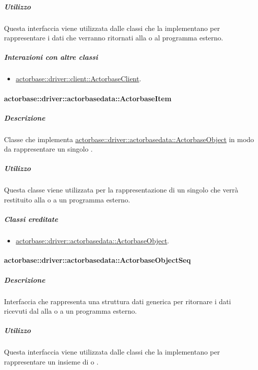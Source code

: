 \documentclass{scalatekids-article}
\begin{document}
\subparagraph{Utilizzo}

Questa interfaccia viene utilizzata dalle classi che la implementano per
rappresentare i dati che verranno ritornati alla  o al programma
esterno.

\subparagraph{Interazioni con altre classi}

\begin{itemize}
\item \hyperref[sec:actorbase::driver::client::ActorbaseClient]{actorbase::driver::client::ActorbaseClient}.
\end{itemize}

\paragraph{actorbase::driver::actorbasedata::ActorbaseItem}
\label{sec:actorbase::driver::actorbasedata::ActorbaseItem}

\subparagraph{Descrizione}

Classe che implementa \hyperref[sec:actorbase::driver::actorbasedata::ActorbaseObject]{actorbase::driver::actorbasedata::ActorbaseObject}
in modo da rappresentare un singolo .

\subparagraph{Utilizzo}

Questa classe viene utilizzata per la rappresentazione di un singolo
 che verrà restituito alla  o a un programma esterno.

\subparagraph{Classi ereditate}

\begin{itemize}
\item \hyperref[sec:actorbase::driver::actorbasedata::ActorbaseObject]{actorbase::driver::actorbasedata::ActorbaseObject}.
\end{itemize}

\paragraph{actorbase::driver::actorbasedata::ActorbaseObjectSeq}
\label{sec:actorbase::driver::actorbasedata::ActorbaseObjectSeq}

\subparagraph{Descrizione}

Interfaccia che rappresenta una struttura dati generica per ritornare i dati
ricevuti dal  alla  o a un programma esterno.

\subparagraph{Utilizzo}

Questa interfaccia viene utilizzata dalle classi che la implementano per
rappresentare un insieme di  o .
\end{document}

